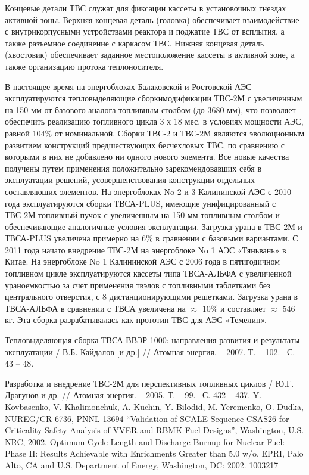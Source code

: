 \documentclass[14pt]{article}
\begin{document}
	
	Концевые  детали  ТВС  служат  для  фиксации  кассеты  в  установочных  гнездах активной  зоны.  Верхняя  концевая  деталь  (головка)  обеспечивает  взаимодействие  с внутрикорпусными устройствами реактора и поджатие ТВС от всплытия, а также разъемное соединение  с  каркасом  ТВС.  Нижняя  концевая  деталь  (хвостовик)  обеспечивает  заданное местоположение кассеты в активной зоне, а также организацию протока теплоносителя. 
	
	В настоящее время на энергоблоках Балаковской и Ростовской АЭС эксплуатируются тепловыделяющие  сборкимодификации  ТВС-2М с  увеличенным  на  150  мм  от  базового аналога топливным столбом (до 3680 мм), что позволяет обеспечить реализацию топливного цикла 3 х 18 мес. в условиях мощности АЭС, равной 104\% от номинальной. Сборки   ТВС-2   и   ТВС-2М   являются   эволюционным   развитием   конструкций предшествующих бесчехловых ТВС, по сравнению с которыми в них не добавлено ни одного нового   элемента.   Все   новые   качества   получены   путем применения   положительно зарекомендовавших  себя  в  эксплуатации  решений,  усовершенствования  конструкции отдельных составляющих элементов. На  энергоблоках  No  2  и  3  Калининской  АЭС  с  2010  года  эксплуатируются  сборки ТВСА-PLUS,  имеющие  унифицированный  с  ТВС-2М  топливный  пучок с  увеличенным  на 150 мм топливным столбом и обеспечивающие аналогичные условия эксплуатации. Загрузка урана  в  ТВС-2М  и  ТВСА-PLUS  увеличена  примерно  на  6\%  в  сравнении  с  базовыми вариантами. С 2011 года начато внедрение ТВС-2М на энергоблоке No 1 АЭС «Тяньвань» в Китае. На энергоблоке No 1 Калининской АЭС с 2006 года в пятигодичном топливном цикле эксплуатируются  кассеты  типа ТВСА-АЛЬФА  с  увеличенной  ураноемкостью  за  счет применения   твэлов   с   топливными   таблетками   без   центрального   отверстия,   с   8 дистанционирующими  решетками.  Загрузка  урана  в  ТВСА-АЛЬФА  в  сравнении  с  ТВСА увеличена на $\approx$ 10\% и составляет $ \approx$ 546 кг. Эта сборка разрабатывалась как прототип ТВС для АЭС «Темелин». 
	
	
	
	\newpage
\begin{thebibliography}{5}
Тепловыделяющая  сборка  ТВСА  ВВЭР-1000:  направления  развития  и  результаты эксплуатации / В.Б. Кайдалов [и др.] // Атомная энергия. – 2007. Т. – 102.– С. 43 – 48.

Разработка  и  внедрение  ТВС-2М  для  перспективных топливных  циклов  /  Ю.Г. Драгунов и др. // Атомная энергия. – 2005. Т. – 99.– С. 432 – 437. 
  Y.  Kovbasenko,  V.  Khalimonchuk,  A.  Kuchin,  Y.  Bilodid,  M.  Yeremenko, O. Dudka, NUREG/CR-6736, PNNL-13694 “Validation of SCALE Sequence CSAS26 for Criticality Safety Analysis of VVER and RBMK Fuel Designs”, Washington, U.S. NRC, 2002.
 Optimum Cycle Length and Discharge Burnup for Nuclear Fuel: Phase II: Results Achievable with Enrichments Greater than 5.0 w/o, EPRI,  Palo  Alto,  CA  and  U.S.  Department  of Energy,  Washington,  DC: 2002. 1003217
\end{thebibliography}
	
\end{document}
